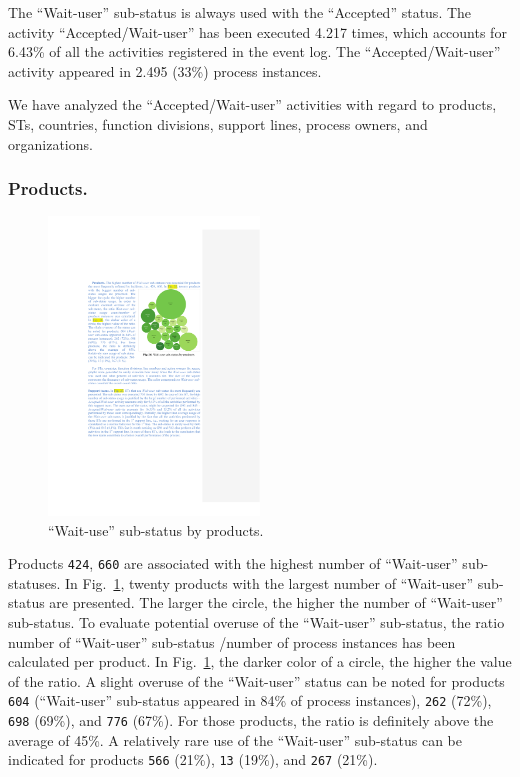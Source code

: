 \documentclass[lnbip]{svmultln}
\begin{document}
The ``Wait-user'' sub-status is always used with the ``Accepted'' status. The activity ``Accepted/Wait-user'' has been executed 4.217 times, which  accounts for 6.43\% of all the activities registered in the event log. The ``Accepted/Wait-user'' activity appeared in 2.495 (33\%) process instances.

We have analyzed the ``Accepted/Wait-user'' activities with regard to products, STs, countries, function divisions, support lines, process owners, and organizations.

\subsubsection{Products.} 
\begin{figure}
  \vspace{-28pt}
  \begin{center}
    \includegraphics[width=0.5\textwidth]{"figs/pic 28"}
  \end{center}
  \vspace{-10pt}
  \caption{``Wait-use'' sub-status by products.}
  \label{fig:waitUseProducts}
  \vspace{-10pt}
\end{figure}


Products \texttt{424}, \texttt{660} are associated with the highest number of ``Wait-user'' sub-statuses. In Fig.~\ref{fig:waitUseProducts}, twenty products with the largest number of ``Wait-user'' sub-status are presented. The larger the circle, the higher the number of ``Wait-user'' sub-status. To evaluate potential overuse of the ``Wait-user'' sub-status, the ratio number of ``Wait-user'' sub-status /number of process instances has been calculated per product. In Fig.~\ref{fig:waitUseProducts}, the darker color of a circle, the higher the value of the ratio. A slight overuse of the ``Wait-user'' status can be noted for products  \texttt{604} (``Wait-user'' sub-status appeared in 84\% of process instances), \texttt{262} (72\%), \texttt{698} (69\%), and \texttt{776} (67\%). For those products, the ratio is definitely above the average of 45\%. A relatively rare use of the ``Wait-user'' sub-status can be indicated for products \texttt{566} (21\%), \texttt{13} (19\%), and \texttt{267} (21\%).
\end{document}
